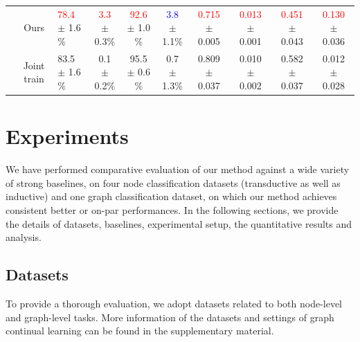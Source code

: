 \documentclass[letterpaper]{article} %
\begin{document}
\begin{table}[]
{\begin{tabular}{c|c|lc|cc|cc|cc}
                                                                       & Ours                     & \textcolor{red}{78.4} $\pm$ 1.6$\%$ & \textcolor{red}{3.3} $\pm$ 0.3$\%$ & \textcolor{red}{92.6} $\pm$ 1.0$\%$ & \textcolor{blue}{3.8} $\pm$ 1.1$\%$ & \textcolor{red}{0.715} $\pm$ 0.005 & \textcolor{red}{0.013} $\pm$ 0.001 & \textcolor{red}{0.451} $\pm$ 0.043    & \textcolor{red}{0.130} $\pm$ 0.036 \\ %
                                                                       & Joint train              & 83.5 $\pm$ 1.6$\%$ & 0.1 $\pm$ 0.2$\%$                           & 95.5 $\pm$ 0.6$\%$                           & 0.7 $\pm$ 1.3$\%$                          & 0.809 $\pm$ 0.037                           & 0.010 $\pm$ 0.002                         & 0.582 $\pm$ 0.037    & 0.012 $\pm$ 0.028                           \\ \bottomrule
\end{tabular}%
}
\label{result}
\vspace{-1.0em}
\end{table}




\section{Experiments}
We have performed comparative evaluation of our method against a wide variety of strong baselines, on four node classification datasets (transductive as well as inductive) and one graph classification dataset,
on which our method achieves 
{consistent better or on-par} performances.
In the following sections, we provide the details of datasets, baselines, experimental setup, the quantitative results and analysis.

\subsection{Datasets}
To provide a thorough evaluation, 
we adopt datasets related to both
node-level and graph-level tasks.
More information of the datasets and settings of graph continual learning 
can be found in the supplementary material.
\end{document}
